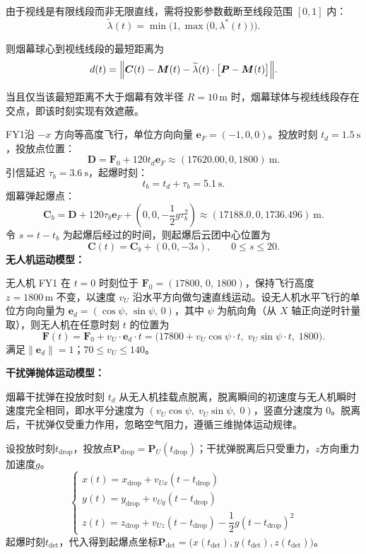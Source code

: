 \documentclass[12pt,a4paper]{article}
\begin{document}
	由于视线是有限线段而非无限直线，需将投影参数截断至线段范围 $[0,1]$ 内：
	\[
	\widetilde{\lambda}(t)=\min\bigl(1,\max\bigl(0,\lambda^{*}(t)\bigr)\bigr).
	\]
	
	则烟幕球心到视线线段的最短距离为
	\[
	d(t)=\Bigl\|\boldsymbol{C}(t)-\boldsymbol{M}(t)-\widetilde{\lambda}(t)\cdot \bigl[\boldsymbol{P}-\boldsymbol{M}(t)\bigr]\Bigr\|.
	\]
	
	当且仅当该最短距离不大于烟幕有效半径 $R=10\,\text{m}$ 时，烟幕球体与视线线段存在交点，即该时刻实现有效遮蔽。
	
	
	FY1沿 $-x$ 方向等高度飞行，单位方向向量 $\boldsymbol e_F=(-1,0,0)$。投放时刻 $t_d=1.5\ \mathrm{s}$，投放点位置：
	\[
	\boldsymbol D=\boldsymbol F_0+120 t_d \boldsymbol e_F \approx (17620.00,0,1800)\ \mathrm{m}.
	\]
	引信延迟 $\tau_b=3.6\ \mathrm{s}$，起爆时刻：
	\[
	t_b = t_d + \tau_b = 5.1\ \mathrm{s}.
	\]
	烟幕弹起爆点：
	\[
	\boldsymbol C_b=\boldsymbol D+120\tau_b \boldsymbol e_F+\left(0,0,-\frac12 g \tau_b^2\right)
	\approx(17188.0,0,1736.496)\ \mathrm{m}.
	\]
	令 $s = t-t_b$ 为起爆后经过的时间，则起爆后云团中心位置为
	\[
	\boldsymbol C(t)=\boldsymbol C_b+(0,0,-3s),\qquad 0\le s \le 20.
	\]
	\textbf{无人机运动模型：}
	
	无人机 FY1 在 $t=0$ 时刻位于 $\boldsymbol{F}_0=(17800,\,0,\,1800)$，保持飞行高度 $z=1800\,\text{m}$ 不变，以速度 $v_U$ 沿水平方向做匀速直线运动。设无人机水平飞行的单位方向向量为 $\boldsymbol{e}_d=(\cos\psi,\,\sin\psi,\,0)$，其中 $\psi$ 为航向角（从 $X$ 轴正向逆时针量取），则无人机在任意时刻 $t$ 的位置为
	\[
	\boldsymbol{F}(t)=\boldsymbol{F}_0 + v_U\cdot \boldsymbol{e}_d\cdot t=\bigl(17800 + v_U\cos\psi\cdot t,\; v_U\sin\psi\cdot t,\; 1800\bigr).
	\]
	满足$\|\boldsymbol{e}_d\|=1$；$70\le v_U \le 140$。
	
	\textbf{干扰弹抛体运动模型：}
	
	烟幕干扰弹在投放时刻 $t_d$ 从无人机挂载点脱离，脱离瞬间的初速度与无人机瞬时速度完全相同，即水平分速度为 $(v_U \cos\psi,\; v_U \sin\psi,\; 0)$，竖直分速度为 $0$。脱离后，干扰弹仅受重力作用，忽略空气阻力，遵循三维抛体运动规律。
	
	
	设投放时刻$t_\text{drop}$，投放点$\boldsymbol{P}_\text{drop}=\boldsymbol{P}_U(t_\text{drop})$；干扰弹脱离后只受重力，$z$方向重力加速度$g$。
	\[
	\begin{cases}
		x(t) = x_\text{drop} + v_{Ux}(t-t_\text{drop})\\
		y(t) = y_\text{drop} + v_{Uy}(t-t_\text{drop})\\
		z(t) = z_\text{drop} + v_{Uz}(t-t_\text{drop})-\dfrac12 g(t-t_\text{drop})^2
	\end{cases}
	\]
	起爆时刻$t_\text{det}$，代入得到起爆点坐标$\boldsymbol{P}_\text{det}=\big(x(t_\text{det}),y(t_\text{det}),z(t_\text{det})\big)$。
	
\end{document}
